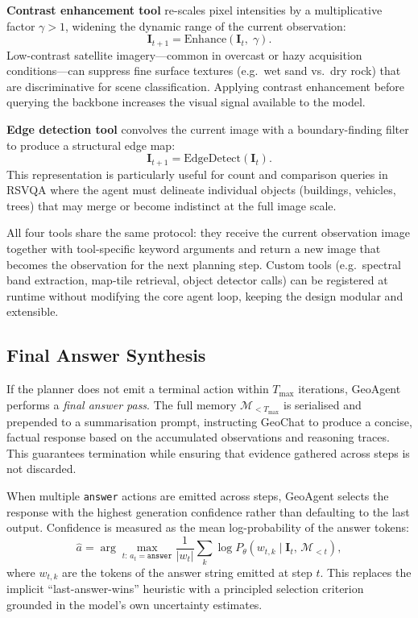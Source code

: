 \documentclass{article}
\begin{document}
\textbf{Contrast enhancement tool} re-scales pixel intensities by a multiplicative
factor $\gamma > 1$, widening the dynamic range of the current observation:
\begin{equation}
  \mathbf{I}_{t+1} = \mathrm{Enhance}(\mathbf{I}_t,\;\gamma).
\end{equation}
Low-contrast satellite imagery---common in overcast or hazy acquisition
conditions---can suppress fine surface textures (e.g.\ wet sand vs.\ dry rock)
that are discriminative for scene classification.  Applying contrast enhancement
before querying the backbone increases the visual signal available to the model.

\textbf{Edge detection tool} convolves the current image with a boundary-finding
filter to produce a structural edge map:
\begin{equation}
  \mathbf{I}_{t+1} = \mathrm{EdgeDetect}(\mathbf{I}_t).
\end{equation}
This representation is particularly useful for count and comparison queries in
RSVQA where the agent must delineate individual objects (buildings, vehicles,
trees) that may merge or become indistinct at the full image scale.

All four tools share the same protocol: they receive the current observation image
together with tool-specific keyword arguments and return a new image that becomes
the observation for the next planning step.  Custom tools (e.g.\ spectral band
extraction, map-tile retrieval, object detector calls) can be registered at runtime
without modifying the core agent loop, keeping the design modular and extensible.

\subsection{Final Answer Synthesis}

If the planner does not emit a terminal action within $T_{\max}$ iterations,
GeoAgent performs a \emph{final answer pass}.  The full memory
$\mathcal{M}_{<T_{\max}}$ is serialised and prepended to a summarisation prompt,
instructing GeoChat to produce a concise, factual response based on the accumulated
observations and reasoning traces.  This guarantees termination while ensuring that
evidence gathered across steps is not discarded.

When multiple \texttt{answer} actions are emitted across steps, GeoAgent
selects the response with the highest generation confidence rather than
defaulting to the last output.  Confidence is measured as the mean
log-probability of the answer tokens:
\begin{equation}
  \hat{a} = \arg\max_{t:\,a_t = \texttt{answer}}
    \frac{1}{|w_t|}\sum_{k} \log P_{\theta}(w_{t,k} \mid \mathbf{I}_t,\,
    \mathcal{M}_{<t}),
\end{equation}
where $w_{t,k}$ are the tokens of the answer string emitted at step $t$.
This replaces the implicit ``last-answer-wins'' heuristic with a principled
selection criterion grounded in the model's own uncertainty estimates.
\end{document}
